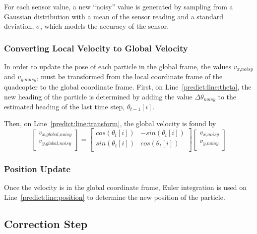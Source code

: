 
			For each sensor value, a new ``noisy'' value is generated by sampling from a Gaussian distribution with a mean of the sensor reading and a standard deviation, $\sigma$, which models the accuracy of the sensor. 
		
		\subsubsection{Converting Local Velocity to Global Velocity}
			In order to update the pose of each particle in the global frame, the values $v_{\textit{x,noisy}}$ and $v_{\textit{y,noisy}}$, must be transformed from the local coordinate frame of the quadcopter to the global coordinate frame. First, on Line~\ref{predict:line:theta}, the new heading of the particle is determined by adding the value $\Delta\theta_{\textit{noisy}}$ to the estimated heading of the last time step, $\theta_{t-1}[i]$.

			Then, on Line~\ref{predict:line:transform}, the global velocity is found by
			\[
			\begin{bmatrix} 
			  v_{\textit{x,global,noisy}}\\
			  v_{\textit{y,global,noisy}}\\
			\end{bmatrix}
			=
			\begin{bmatrix} 
			  cos(\theta_t[i]) & -sin(\theta_t[i])\\
			  sin(\theta_t[i]) & cos(\theta_t[i])\\
			\end{bmatrix}
			\begin{bmatrix} 
			  v_{\textit{x,noisy}}\\
			  v_{\textit{y,noisy}}\\
			\end{bmatrix}
			\]

		\subsubsection{Position Update}
			Once the velocity is in the global coordinate frame, Euler integration is used on Line~\ref{predict:line:position} to determine the new position of the particle.

	\subsection{Correction Step}
		
